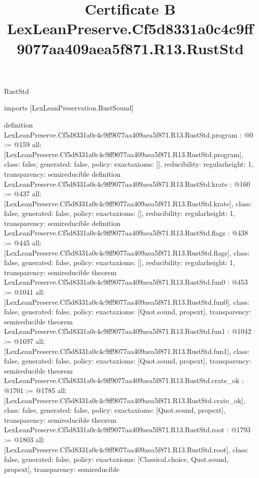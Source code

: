 \begin{lexlean}{RustStd}
\title{Certificate B LexLeanPreserve.Cf5d8331a0c4c9ff9077aa409aea5f871.R13.RustStd}
\begin{coremodule}
imports [LexLeanPreservation.RustSound]

definition LexLeanPreserve.Cf5d8331a0c4c9ff9077aa409aea5f871.R13.RustStd.program : @0 := @159 {
  all: [LexLeanPreserve.Cf5d8331a0c4c9ff9077aa409aea5f871.R13.RustStd.program],
  class: false,
  generated: false,
  policy: exact{axioms: []},
  reducibility: regular{height: 1},
  transparency: semireducible
}
definition LexLeanPreserve.Cf5d8331a0c4c9ff9077aa409aea5f871.R13.RustStd.krate : @160 := @437 {
  all: [LexLeanPreserve.Cf5d8331a0c4c9ff9077aa409aea5f871.R13.RustStd.krate],
  class: false,
  generated: false,
  policy: exact{axioms: []},
  reducibility: regular{height: 1},
  transparency: semireducible
}
definition LexLeanPreserve.Cf5d8331a0c4c9ff9077aa409aea5f871.R13.RustStd.flags : @438 := @445 {
  all: [LexLeanPreserve.Cf5d8331a0c4c9ff9077aa409aea5f871.R13.RustStd.flags],
  class: false,
  generated: false,
  policy: exact{axioms: []},
  reducibility: regular{height: 1},
  transparency: semireducible
}
theorem LexLeanPreserve.Cf5d8331a0c4c9ff9077aa409aea5f871.R13.RustStd.fun0 : @453 := @1041 {
  all: [LexLeanPreserve.Cf5d8331a0c4c9ff9077aa409aea5f871.R13.RustStd.fun0],
  class: false,
  generated: false,
  policy: exact{axioms: [Quot.sound, propext]},
  transparency: semireducible
}
theorem LexLeanPreserve.Cf5d8331a0c4c9ff9077aa409aea5f871.R13.RustStd.fun1 : @1042 := @1697 {
  all: [LexLeanPreserve.Cf5d8331a0c4c9ff9077aa409aea5f871.R13.RustStd.fun1],
  class: false,
  generated: false,
  policy: exact{axioms: [Quot.sound, propext]},
  transparency: semireducible
}
theorem LexLeanPreserve.Cf5d8331a0c4c9ff9077aa409aea5f871.R13.RustStd.crate_ok : @1701 := @1785 {
  all: [LexLeanPreserve.Cf5d8331a0c4c9ff9077aa409aea5f871.R13.RustStd.crate_ok],
  class: false,
  generated: false,
  policy: exact{axioms: [Quot.sound, propext]},
  transparency: semireducible
}
theorem LexLeanPreserve.Cf5d8331a0c4c9ff9077aa409aea5f871.R13.RustStd.root : @1793 := @1803 {
  all: [LexLeanPreserve.Cf5d8331a0c4c9ff9077aa409aea5f871.R13.RustStd.root],
  class: false,
  generated: false,
  policy: exact{axioms: [Classical.choice, Quot.sound, propext]},
  transparency: semireducible
}


\end{coremodule}
\end{lexlean}
